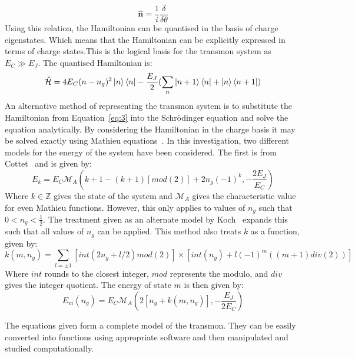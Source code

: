 \documentclass[11pt]{article}
\newcommand*{\hatH}{\hat{\mathcal{H}}}
\begin{document}
\begin{equation} \label{eq:5}
\boldsymbol{\hat{n}} = \frac{1}{i} \frac{\delta}{\delta\theta}
\end{equation}
Using this relation, the Hamiltonian can be quantised in the basis of charge eigenstates. Which means that the Hamiltonian can be explicitly expressed in terms of charge states.This is the logical basis for the transmon system as $E_C \gg E_J$. The quantised Hamiltonian is:
\begin{equation} \label{eq:6}
\hatH = 4E_C (n-n_g)^2 \ket{n}\bra{n} - \frac{E_J}{2}(\sum_{n} \ket{n+1}\bra{n} + \ket{n}\bra{n+1})
\end{equation}
An alternative method of representing the transmon system is to substitute the Hamiltonian from Equation~\ref{eq:3} into the Schr\"odinger equation and solve the equation analytically.
By considering the Hamiltonian in the charge basis it may be solved exactly using Mathieu equations~\cite{rubyApplicationsMathieuEquation1996}. In this investigation, two different models for the energy of the system have been considered. The first is from Cottet~\cite{cottetImplementationQuantumBit2002} and is given by:
\begin{equation} \label{eq:7}
E_k = E_C \mathcal{M}_A (k+1 - (k+1)[mod(2)] + 2n_g(-1)^k, -\frac{2E_J}{E_C})
\end{equation}
Where $k \in \mathbb{Z}$ gives the state of the system and $\mathcal{M}_A$ gives the characteristic value for even Mathieu functions. However, this only applies to values of $n_g$ such that $0 < n_g < \frac{1}{2}$. The treatment given as an alternate model by Koch~\cite{kochChargeinsensitiveQubitDesign2007} expands this such that all values of $n_g$ can be applied. This method also treats $k$ as a function, given by:
\begin{equation} \label{eq:8}
k(m, n_g) = \sum_{l=\pm 1} [int(2n_g + l/2)mod(2)] \times [int(n_g) + l(-1)^m ((m+1)div(2))]
\end{equation}
Where $int$ rounds to the closest integer, $mod$ represents the modulo, and $div$ gives the integer quotient. The energy of state $m$ is then given by:
\begin{equation} \label{eq:9}
E_m(n_g) = E_C \mathcal{M}_A (2[n_g + k(m,n_g)],-\frac{E_J}{2E_C})
\end{equation}

The equations given form a complete model of the transmon. They can be easily converted into functions using appropriate software and then manipulated and studied computationally.
\end{document}
